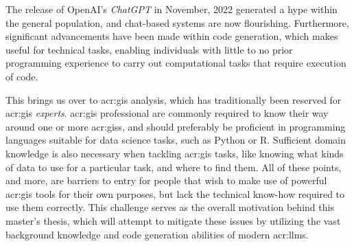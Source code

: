 \begin{comment}
Having a template to work from provides a starting point.
However, for a given project, a slight variation in the template may be required due to the nature of the given project.
Furthermore, the order in which the various chapters and sections will be written will also vary from project to project,
but the writing will seldom start at the abstract and sequentially follow the chapters of the report.
One critical reason for this is that you need to start writing as early as possible and that you will begin to write up where you are currently focusing.
However, do not leave working on the abstract until the very last days. The abstract is the first thing anyone reads of an article or thesis --- after the title;
and thus it is important that it is very well written. Abstracts are hard to write, so create revisions throughout the course of your project.

The background and motivation here should state where your project is situated in the field and what the key driving forces motivating this research are.
However, keep this section brief, as it is still part of the introduction.
The motivation will be further elaborated on in Chapter~\ref{cha:related_work}, presenting your complete state-of-the-art.

Note that this template uses italics to highlight where Latin wording is inserted to represent text and the text of the template
that we wish to draw your attention to. The italics themselves are not an indication that such sections should use italics.

\end{comment}

The release of OpenAI's \textit{ChatGPT} in November, 2022 \citep{openaiIntroducingChatGPT2022} generated a hype within the general population, and chat-based systems are now flourishing. Furthermore, significant advancements have been made within code generation, which makes  useful for technical tasks, enabling individuals with little to no prior programming experience to carry out computational tasks that require execution of code.

This brings us over to \gls{acr:gis} analysis, which has traditionally been reserved for \acrshort{acr:gis} \textit{experts}. \acrshort{acr:gis} professional are commonly required to know their way around one or more \glspl{acr:gis}, and should preferably be proficient in programming languages suitable for data science tasks, such as Python or R. Sufficient domain knowledge is also necessary when tackling \acrshort{acr:gis} tasks, like knowing what kinds of data to use for a particular task, and where to find them. All of these points, and more, are barriers to entry for people that wish to make use of powerful \acrshort{acr:gis} tools for their own purposes, but lack the technical know-how required to use them correctly. This challenge serves as the overall motivation behind this master's thesis, which will attempt to mitigate these issues by utilizing the vast background knowledge and code generation abilities of modern \glspl{acr:llm}.

